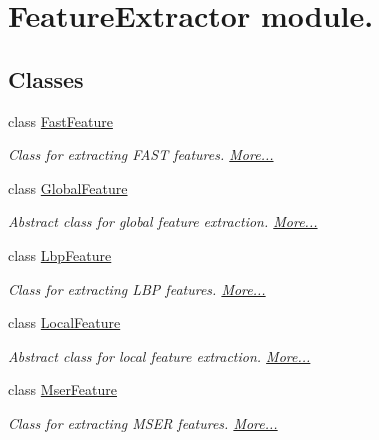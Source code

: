 \hypertarget{group___feature_extractor}{\section{Feature\-Extractor module.}
\label{group___feature_extractor}
}
\subsection*{Classes}
\begin{DoxyCompactItemize}
\item 
class \hyperlink{group___feature_extractor_class_fast_feature}{Fast\-Feature}
\begin{DoxyCompactList}\small\item\em Class for extracting F\-A\-S\-T features.  \hyperlink{group___feature_extractor_class_fast_feature}{More...}\end{DoxyCompactList}\item 
class \hyperlink{group___feature_extractor_class_global_feature}{Global\-Feature}
\begin{DoxyCompactList}\small\item\em Abstract class for global feature extraction.  \hyperlink{group___feature_extractor_class_global_feature}{More...}\end{DoxyCompactList}\item 
class \hyperlink{group___feature_extractor_class_lbp_feature}{Lbp\-Feature}
\begin{DoxyCompactList}\small\item\em Class for extracting L\-B\-P features.  \hyperlink{group___feature_extractor_class_lbp_feature}{More...}\end{DoxyCompactList}\item 
class \hyperlink{group___feature_extractor_class_local_feature}{Local\-Feature}
\begin{DoxyCompactList}\small\item\em Abstract class for local feature extraction.  \hyperlink{group___feature_extractor_class_local_feature}{More...}\end{DoxyCompactList}\item 
class \hyperlink{group___feature_extractor_class_mser_feature}{Mser\-Feature}
\begin{DoxyCompactList}\small\item\em Class for extracting M\-S\-E\-R features.  \hyperlink{group___feature_extractor_class_mser_feature}{More...}\end{DoxyCompactList}\item 

\end{DoxyCompactItemize}
